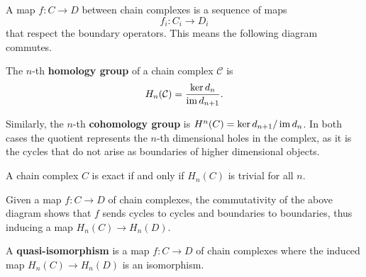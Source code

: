 \documentclass[twoside,10pt]{report}
\begin{document}
A map $f:C\to D$ between chain complexes is a sequence of maps \[f_i:C_i\to D_i\] that respect the boundary operators. This means the following diagram commutes.
\begin{center}
\end{center}

\begin{defn}[]
The $n$-th \textbf{homology group} of a chain complex $\mathcal{C}$ is
\[
	H_{n}(\mathcal{C}) = \frac{\ker d_{n}}{\operatorname{im} d_{n+1}} .
\] 
\end{defn}

Similarly, the $n$-th \textbf{cohomology group} is $H^{n}(C) = \ker d_{n+1}/\operatorname{im} d_{n}$. In both cases the quotient represents the $n$-th dimensional holes in the complex, as it is the cycles that do not arise as boundaries of higher dimensional objects.

A chain complex $C$ is exact if and only if $H_{n}(C)$ is trivial for all $n$.

Given a map $f:C \to D$ of chain complexes, the commutativity of the above diagram shows that $f$ sends cycles to cycles and boundaries to boundaries, thus inducing a map $H_{n}(C) \to H_{n}(D)$.

\begin{defn}[]
	A \textbf{quasi-isomorphism} is a map $f:C\to D$ of chain complexes where the induced map $H_{n}(C)\to H_{n}(D)$ is an isomorphism.
\end{defn}
\end{document}
